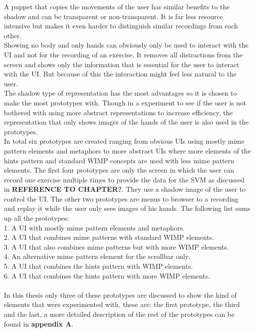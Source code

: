 A puppet that copies the movements of the user has similar benefits to the shadow and can be transparent or non-transparent. It is far less resource intensive but makes it even harder to distinguish similar recordings from each other.\\
 
Showing no body and only hands can obviously only be used to interact with the UI and not for the recording of an exercise. It removes all distractions from the screen and shows only the information that is essential for the user to interact with the UI. But because of this the interaction might feel less natural to the user.\\
 
The shadow type of representation has the most advantages so it is chosen to make the most prototypes with. Though in a experiment to see if the user is not bothered with using more abstract representations to increase efficiency, the representation that only shows images of the hands of the user is also used in the prototypes.\\
 
In total six prototypes are created ranging from obvious UIs using mostly mime pattern elements and metaphors to more abstract UIs where more elements of the hints pattern and standard WIMP concepts are used with less mime pattern elements. The first four prototypes are only the screen in which the user can record one exercise multiple times to provide the data for the SVM as discussed in \textbf{REFERENCE TO CHAPTER?}. They use a shadow image of the user to control the UI. The other two prototypes are menus to browser to a recording and replay it while the user only sees images of his hands. The following list sums up all the prototypes: \\

1. A UI with mostly mime pattern elements and metaphors. \\
2. A UI that combines mime patterns with standard WIMP elements. \\
3. A UI that also combines mime patterns but with more WIMP elements. \\
4. An alternative mime pattern element for the scrollbar only. \\
5. A UI that combines the hints pattern with WIMP elements. \\
6. A UI that combines the hints pattern with more WIMP elements.\\ \\

In this thesis only three of these prototypes are discussed to show the kind of elements that were experimented with, these are: the first prototype, the third and the last, a more detailed description of the rest of the prototypes can be found in \textbf{appendix A}.\\

